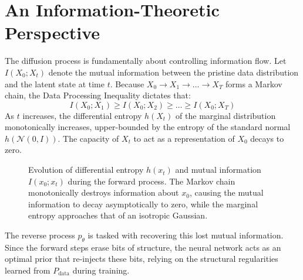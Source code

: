 \section{An Information-Theoretic Perspective}
The diffusion process is fundamentally about controlling information flow. Let $I(X_0; X_t)$ denote the mutual information between the pristine data distribution and the latent state at time $t$. Because $X_0 \to X_1 \to \dots \to X_T$ forms a Markov chain, the Data Processing Inequality dictates that:
\begin{equation}
    I(X_0; X_1) \ge I(X_0; X_2) \ge \dots \ge I(X_0; X_T)
\end{equation}
As $t$ increases, the differential entropy $h(X_t)$ of the marginal distribution monotonically increases, upper-bounded by the entropy of the standard normal $h(\mathcal{N}(0, I))$. The capacity of $X_t$ to act as a representation of $X_0$ decays to zero.

\begin{figure}[htbp]
\centering
{}
\caption{Evolution of differential entropy $h(x_t)$ and mutual information $I(x_0; x_t)$ during the forward process. The Markov chain monotonically destroys information about $x_0$, causing the mutual information to decay asymptotically to zero, while the marginal entropy approaches that of an isotropic Gaussian.}
\label{fig:ddpm_mi}
\end{figure}

The reverse process $p_\theta$ is tasked with recovering this lost mutual information. Since the forward steps erase bits of structure, the neural network acts as an optimal prior that re-injects these bits, relying on the structural regularities learned from $P_{\text{data}}$ during training.

